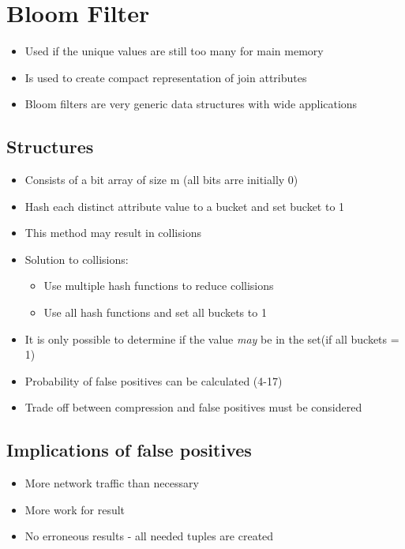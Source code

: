 \documentclass[10pt,a4paper]{scrreprt}
\begin{document}
\section{Bloom Filter}
\begin{itemize}
	\item Used if the unique values are still too many for main memory
	\item Is used to create compact representation of join attributes
	\item Bloom filters are very generic data structures with wide applications
\end{itemize}

\subsection{Structures}
\begin{itemize}
	\item Consists of a bit array of size m (all bits arre initially 0)
	\item Hash each distinct attribute value to a bucket and set bucket to 1
	\item This method may result in collisions
	\item Solution to collisions:
	\begin{itemize}
		\item Use multiple hash functions to reduce collisions
		\item Use all hash functions and set all buckets to 1
	\end{itemize}
	\item It is only possible to determine if the value \textit{may} be in the set(if all buckets = 1)
	\item Probability of false positives can be calculated (4-17)
	\item Trade off between compression and false positives must be considered
\end{itemize}

\subsection{Implications of false positives}
\begin{itemize}
	\item More network traffic than necessary
	\item More work for result
	\item No erroneous results - all needed tuples are created 
\end{itemize}
\end{document}
